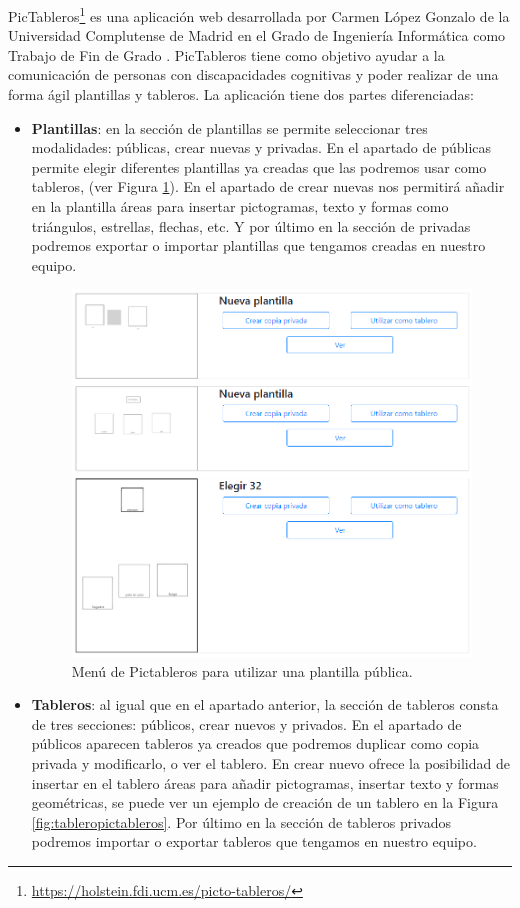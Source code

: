 PicTableros\footnote{\url{https://holstein.fdi.ucm.es/picto-tableros/}} es una aplicación web desarrollada por Carmen López Gonzalo de la Universidad Complutense de Madrid en el Grado de Ingeniería Informática como Trabajo de Fin de Grado \citep{TFGPicTableros}. PicTableros tiene como objetivo ayudar a la comunicación de personas con discapacidades cognitivas y poder realizar de una forma ágil plantillas y tableros. 
La aplicación tiene dos partes diferenciadas:
\begin{itemize}
	\item \textbf{Plantillas}: en la sección de plantillas se permite seleccionar tres modalidades: públicas, crear nuevas y privadas. En el apartado de públicas permite elegir diferentes plantillas ya creadas que las podremos usar como tableros, (ver Figura \ref{fig:pictablerosplantilla}). 
	En el apartado de crear nuevas nos permitirá añadir en la plantilla áreas para insertar pictogramas, texto y formas como triángulos, estrellas, flechas, etc. Y por último en la sección de privadas podremos exportar o importar plantillas que tengamos creadas en nuestro equipo.
	
	\begin{figure}[h!]
		\centering
		\includegraphics[width=0.7\linewidth]{Imagenes/Bitmap/PictablerosPlantilla}
		\caption{Menú de Pictableros para utilizar una plantilla pública.}
		\label{fig:pictablerosplantilla}
	\end{figure}
	
	
	\item \textbf{Tableros}: al igual que en el apartado anterior, la sección de tableros consta de tres secciones: públicos, crear nuevos y privados. En el apartado de públicos aparecen tableros ya creados que podremos duplicar como copia privada y modificarlo, o ver el tablero. En crear nuevo ofrece la posibilidad de insertar en el tablero áreas para añadir pictogramas, insertar texto y formas geométricas, se puede ver un ejemplo de creación de un tablero en la Figura \ref{fig:tableropictableros}. Por último en la sección de tableros privados podremos importar o exportar tableros que tengamos en nuestro equipo.
	

\end{itemize}
